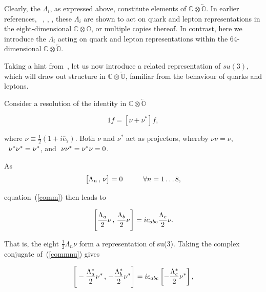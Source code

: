\documentclass[letterpaper,12pt,titlepage,oneside,final]{book}
\begin{document}
Clearly, the $\Lambda_i$, as expressed above, constitute elements of $\mathbb{C}\otimes\overleftarrow{\mathbb{O}}$.  In earlier references, ~\cite{GGquarks}, \cite{GGstats}, \cite{dixon},  these $\Lambda_i$ are shown to act on quark and lepton representations in the eight-dimensional $\mathbb{C}\otimes\mathbb{O}$, or multiple copies thereof.  In contrast, here we introduce the $\Lambda_i$ acting on quark and lepton representations within the 64-dimensional $\mathbb{C}\otimes\overleftarrow{\mathbb{O}}$.

Taking a hint from~\cite{UTI}, let us now introduce a related representation of $su(3)$, which will draw out structure in $\mathbb{C}\otimes\overleftarrow{\mathbb{O}}$, familiar from the behaviour of quarks and leptons.

Consider a resolution of the identity in $\mathbb{C}\otimes\overleftarrow{\mathbb{O}}$

\begin{equation} 1f = \left[\nu + \nu^*\right]f,
\end{equation}

\noindent where $\nu \equiv \frac{1}{2}(1+i\overleftarrow{e_7})$.  Both $\nu$ and $\nu^*$ act as projectors, whereby $\nu  \nu = \nu$, $\hspace{2mm}\nu^*  \nu^* = \nu^*$, and $\hspace{1mm}\nu  \nu^*=\nu^*  \nu=0$.  



As \begin{equation} \big[\Lambda_n \hspace{0.5mm} ,\hspace{0.5mm} \nu \big] = 0 \hspace{1cm} \forall n=1\dots8,
\end{equation}

\noindent equation~(\ref{comm}) then leads to

\begin{equation}\label{commnu}
\Bigg[ \frac{\Lambda_a}{2}\nu \hspace{0.5mm} ,\hspace{0.5mm} \frac{\Lambda_b}{2}\nu \Bigg] = ic_{abc} \frac{\Lambda_c}{2}\nu.
\end{equation}

\noindent That is, the eight $\frac{1}{2}\Lambda_n\nu$ form a representation of su(3).  Taking the complex conjugate of~(\ref{commnu}) gives

\begin{equation}\label{commnustar}
\Bigg[ -\frac{\Lambda_a^*}{2}\nu^* \hspace{0.5mm} ,\hspace{0.5mm} -\frac{\Lambda_b^*}{2}\nu^* \Bigg] = ic_{abc} \left[-\frac{\Lambda_c^*}{2}\nu^*\right],
\end{equation}
\end{document}
